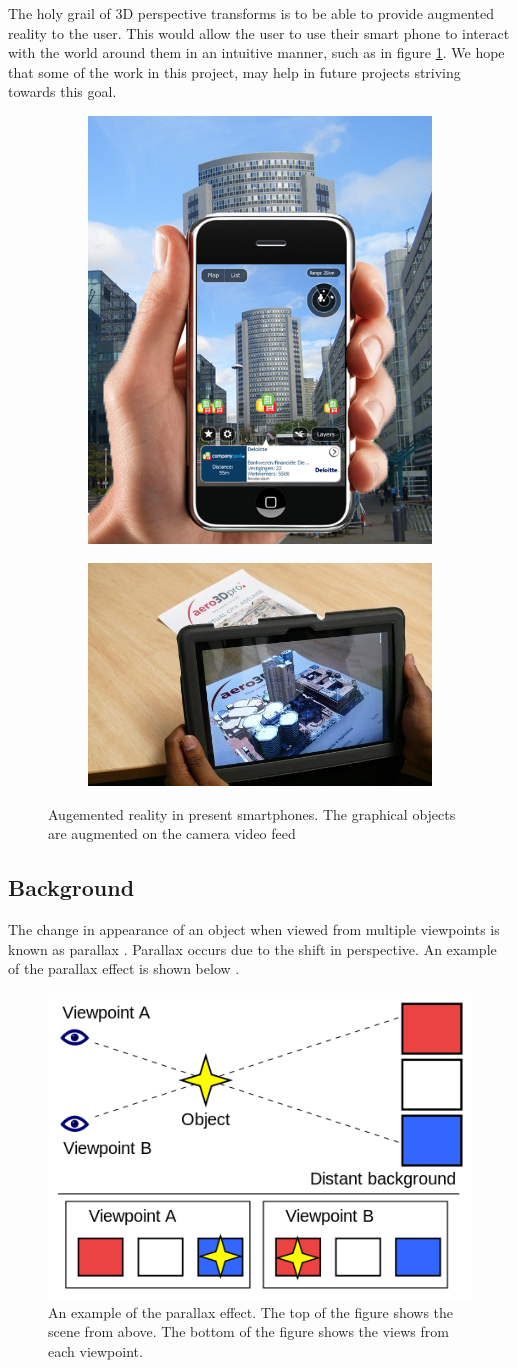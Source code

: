 \documentclass[12pt,twocolumn,letterpaper]{article}
\begin{document}
The holy grail of 3D perspective transforms is to be able to provide augmented reality to the user.  This would allow the user to use their smart phone to interact with the world around them in an intuitive manner, such as in figure \ref{fig:arnow}.  We hope that some of the work in this project, may help in future projects striving towards this goal.


\begin{figure}[!htbp]
\centering
\begin{subfigure}{0.16\textwidth}
\includegraphics[height=35 mm]{images/AR_now}
\end{subfigure}
\begin{subfigure}{0.22\textwidth}
\includegraphics[height=30 mm]{images/AR_now1}
\end{subfigure}
\caption{Augemented reality in present smartphones. The graphical objects are augmented on the camera video feed}
\label{fig:arnow}
\end{figure}

\subsection{Background}

The change in appearance of an object when viewed from multiple viewpoints is known as parallax \cite{Szeliski}.  Parallax occurs due to the shift in perspective.  An example of the parallax effect is shown below \cite{Wikipedia}.

\begin{figure}[!htbp]
\centering
\includegraphics[height=30 mm]{images/parallax.png}
\caption{An example of the parallax effect.  The top of the figure shows the scene from above.  The bottom of the figure shows the views from each viewpoint.}
\end{figure}
\end{document}
